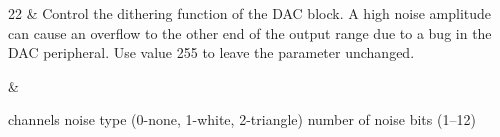 \begin{cmdlist}
	22 & 
	Control the dithering function of the \gls{DAC} block. A high noise amplitude can cause an overflow to the other end of the output range due to a bug in the \gls{DAC} peripheral. Use value 255 to leave the parameter unchanged.

	& \begin{cmdreq}
		 channels
		 noise type (0-none, 1-white, 2-triangle)
		 number of noise bits (1--12)
	\end{cmdreq} \\
\end{cmdlist}



